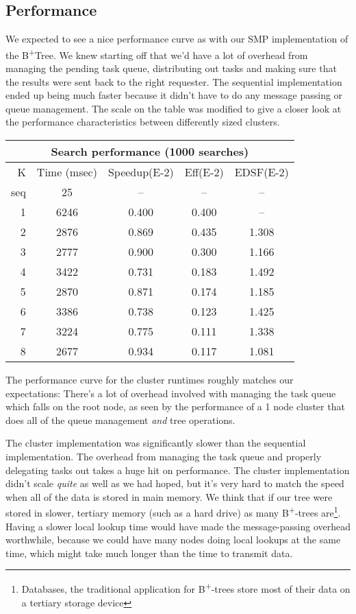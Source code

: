 \documentclass[conference]{IEEEtran}
\begin{document}
\subsection{Performance}
We expected to see a nice performance curve as with our SMP implementation of the
B\textsuperscript{+}Tree. We knew starting off that we'd have a lot of overhead
from managing the pending task queue, distributing out tasks and making sure
that the results were sent back to the right requester. The sequential
implementation ended up being much faster because it didn't have to do any
message passing or queue management. The scale on the table was modified to give
a closer look at the performance characteristics between differently sized
clusters.
\begin{center}
\begin{tabular}{ | r | c | c | c | c | }
\hline
\multicolumn{5}{|c|}{Search performance (1000 searches)}\\\hline\hline
K & Time (msec) & Speedup({\small E}-2) & Eff({\small E}-2) & EDSF({\small E}-2) \\\hline
seq & 25 & \--- & \--- & \--- \\\hline
1&6246 & 0.400 & 0.400 & \--- \\\hline
2&2876 & 0.869 & 0.435 & 1.308 \\\hline
3&2777 & 0.900 & 0.300 & 1.166 \\\hline
4&3422 & 0.731 & 0.183 & 1.492 \\\hline
5&2870 & 0.871 & 0.174 & 1.185 \\\hline
6&3386 & 0.738 & 0.123 & 1.425 \\\hline
7&3224 & 0.775 & 0.111 & 1.338 \\\hline
8&2677 & 0.934 & 0.117 & 1.081 \\\hline
\end{tabular}
\end{center}
The performance curve for the cluster runtimes roughly matches our expectations:
There's a lot of overhead involved with managing the task queue which falls on
the root node, as seen by the performance of a 1 node cluster that does all of
the queue management {\em and} tree operations.

The cluster implementation was significantly slower than the sequential
implementation. The overhead from managing the task queue and properly
delegating tasks out takes a huge hit on performance. The cluster implementation
didn't scale {\em quite} as well as we had hoped, but it's very hard to match
the speed when all of the data is stored in main memory. We think that if our
tree were stored in slower, tertiary memory (such as a hard drive) as many
B\textsuperscript{+}-trees are\footnote{Databases, the traditional application
for B\textsuperscript{+}-trees store most of their data on a tertiary storage
device}. Having a slower local lookup time would have made the message-passing
overhead worthwhile, because we could have many nodes doing local lookups at the
same time, which might take much longer than the time to transmit data.
\end{document}
